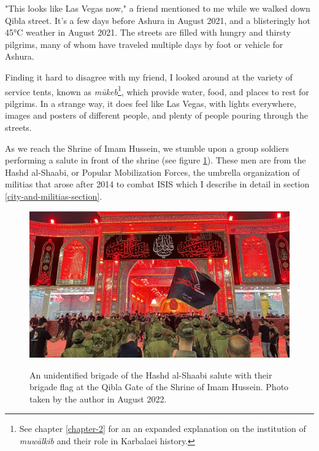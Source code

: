 "This looks like Las Vegas now," a friend mentioned to me while we walked down Qibla street. It's a few days before Ashura in August 2021, and a blisteringly hot 45°C weather in August 2021. The streets are filled with hungry and thirsty pilgrims, many of whom have traveled multiple days by foot or vehicle for Ashura. 

Finding it hard to disagree with my friend, I looked around at the variety of service tents, known as \emph{mūkeb}\footnote{See chapter \ref{chapter-2} for an an expanded explanation on the institution of \emph{muwālkib} and their role in Karbalaei history.}, which provide water, food, and places to rest for pilgrims. In a strange way, it does feel like Las Vegas, with lights everywhere, images and posters of different people, and plenty of people pouring through the streets. 


As we reach the Shrine of Imam Hussein, we stumble upon a group soldiers performing a salute in front of the shrine (see figure \ref{fig:hashd-salute}). These men are from the Hashd al-Shaabi, or Popular Mobilization Forces, the umbrella organization of militias that arose after 2014 to combat ISIS which I describe in detail in section \ref{city-and-militias-section}. 

\begin{figure}
\caption{An unidentified brigade of the Hashd al-Shaabi salute with their brigade flag at the Qibla Gate of the Shrine of Imam Hussein. Photo taken by the author in August 2022.}\centering
\includegraphics[width=.75\textwidth]{images/hashd-salutes.jpeg}
\label{fig:hashd-salute}
\end{figure}

